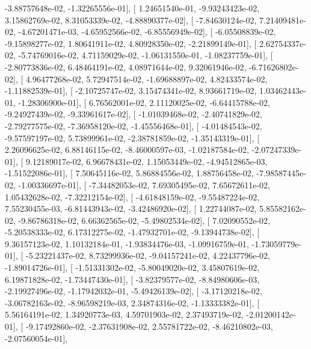 \documentclass{article}
\begin{document}
         -3.88757648e-02,  -1.32265556e-01],
       [  1.24651540e-01,  -9.93243423e-02,   3.15862769e-02,
          8.31053339e-02,  -4.88890377e-02],
       [ -7.84630124e-02,   7.21409481e-02,  -4.67201471e-03,
         -4.65952566e-02,  -6.85556949e-02],
       [ -6.05508839e-02,  -9.15898277e-02,   1.80641911e-02,
          4.80928350e-02,  -2.21899149e-01],
       [  2.62754337e-02,  -5.74769016e-02,   4.71159029e-02,
         -1.06131550e-01,  -1.08237759e-01],
       [ -2.80773836e-02,   6.48464191e-02,   4.08971644e-02,
          9.32061946e-02,  -6.71626802e-02],
       [  4.96477268e-02,   5.72947514e-02,  -1.69688897e-02,
          4.82433574e-02,  -1.11882539e-01],
       [ -2.10725747e-02,   3.15474341e-02,   8.93661719e-02,
          1.03462443e-01,  -1.28306900e-01],
       [  6.76562001e-02,   2.11120025e-02,  -6.64415788e-02,
         -9.24927439e-02,  -9.33961617e-02],
       [ -1.01039468e-02,  -2.40741829e-02,  -2.79277575e-02,
         -7.36958120e-02,  -1.45556468e-01],
       [ -4.01484543e-02,  -9.57597197e-02,   5.73899961e-02,
         -2.38781859e-02,  -1.35143319e-01],
       [  2.26096625e-02,   6.88146115e-02,  -8.46000597e-03,
         -1.02187584e-02,  -2.07247339e-01],
       [  9.12189017e-02,   6.96678431e-02,   1.15053449e-02,
         -4.94512865e-03,  -1.51522086e-01],
       [  7.50645116e-02,   5.86884556e-02,   1.88756458e-02,
         -7.98587445e-02,  -1.00336697e-01],
       [ -7.34482053e-02,   7.69305495e-02,   7.65672611e-02,
          1.05432628e-02,  -7.32212154e-02],
       [ -4.61848159e-02,  -9.55487224e-02,   7.55230455e-03,
         -6.81443943e-02,  -3.42486920e-02],
       [  1.22744087e-02,   5.85582162e-02,  -9.86786318e-02,
          6.66362565e-02,  -5.49802534e-02],
       [  7.02090552e-02,  -5.20538333e-02,   6.17312275e-02,
         -1.47932701e-02,  -9.13944738e-02],
       [  9.36157123e-02,   1.10132184e-01,  -1.93834476e-03,
         -1.09916759e-01,  -1.73059779e-01],
       [ -5.23221437e-02,   8.73299936e-02,  -9.04157241e-02,
          4.22437796e-02,  -1.89014726e-01],
       [ -1.51331302e-02,  -5.80049020e-02,   3.45807619e-02,
          6.19871828e-02,  -1.73447430e-01],
       [ -3.82379577e-02,  -8.84980606e-03,  -2.19927496e-02,
         -1.17942032e-01,  -5.49426139e-02],
       [ -3.17120218e-02,  -3.06782163e-02,  -8.96598219e-03,
          2.34874316e-02,  -1.13333382e-01],
       [  5.56164191e-02,   1.34920773e-03,   4.59701903e-02,
          2.37493719e-02,  -2.01200142e-01],
       [ -9.17492860e-02,  -2.37631908e-02,   2.55781722e-02,
         -8.46210802e-03,  -2.07560054e-01],
\end{document}
